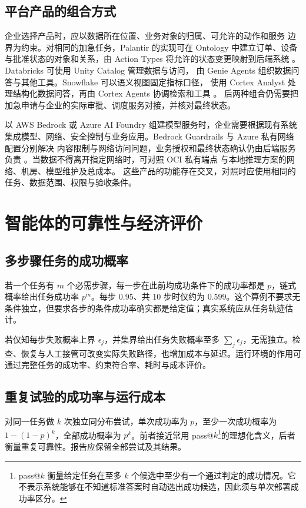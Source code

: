 \subsection{平台产品的组合方式}
企业选择产品时，应以数据所在位置、业务对象的归属、可允许的动作和服务
边界为约束。对相同的加急任务，Palantir 的实现可在 Ontology 中建立订单、设备
与批准状态的对象和关系，由 Action Types 将允许的状态变更映射到后端系统
\cite{palantir02,palantirActions2026}。Databricks 可使用 Unity Catalog 管理数据与访问，
由 Genie Agents 组织数据问答与其他工具。Snowflake 可以语义视图固定指标口径，
使用 Cortex Analyst 处理结构化数据问答，再由 Cortex Agents 协调检索和工具
\cite{databricksUnity2026,databricksGenie2026,snowflakeSemantic2026,snowflakeAgents2026}。
后两种组合仍需要把加急申请与企业的实际审批、调度服务对接，并核对最终状态。

以 AWS Bedrock 或 Azure AI Foundry 组建模型服务时，企业需要根据现有系统集成模型、网络、安全控制与业务应用。Bedrock Guardrails 与 Azure 私有网络配置分别解决
内容限制与网络访问问题，业务授权和最终状态确认仍由后端服务负责
\cite{awsGuardrails2026,azurePrivate2026}。当数据不得离开指定网络时，可对照 OCI 私有端点
与本地推理方案的网络、机房、模型维护及总成本\cite{ociPrivate2026,aiinfra2026}。
这些产品的功能存在交叉，对照时应使用相同的任务、数据范围、权限与验收条件。

\section{智能体的可靠性与经济评价}

\subsection{多步骤任务的成功概率}
若一个任务有 \(m\) 个必需步骤，每一步在此前均成功条件下的成功率都是 \(p\)，链式概率给出任务成功率 \(p^m\)。每步 \(0.95\)、共 10 步时仅约为 \(0.599\)。这个算例不要求无条件独立，但要求各步的条件成功率确实都是给定值；真实系统应从任务轨迹估计。

若仅知每步失败概率上界 \(\epsilon_j\)，并集界给出任务失败概率至多 \(\sum_j\epsilon_j\)，无需独立。检查、恢复与人工接管可改变实际失败路径，也增加成本与延迟。运行环境的作用可通过完整任务的成功率、约束符合率、耗时与成本评价。

\subsection{重复试验的成功率与运行成本}
对同一任务做 \(k\) 次独立同分布尝试，单次成功率为 \(p\)，至少一次成功概率为 \(1-(1-p)^k\)，全部成功概率为 \(p^k\)。前者接近常用 pass@\(k\)\footnote{pass@\(k\) 衡量给定任务在至多 \(k\) 个候选中至少有一个通过判定的成功情况。它不表示系统能够在不知道标准答案时自动选出成功候选，因此须与单次部署成功率区分。}的理想化含义，后者衡量重复可靠性。报告应保留全部尝试及其结果。

